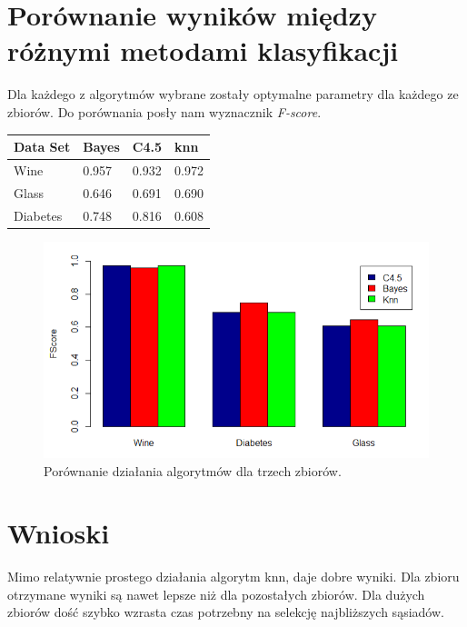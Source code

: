 \documentclass[12pt,a4paper]{article}
\begin{document}
\section{Porównanie wyników między różnymi metodami klasyfikacji}
Dla każdego z algorytmów wybrane zostały optymalne parametry dla każdego ze zbiorów. Do porównania posły nam wyznacznik \textit{F-score}.

\begin{tabular}{ |p{2.5cm}||p{2.5cm}|p{2.5cm}|p{2.5cm}| }
\hline
Data Set & Bayes & C4.5 & knn \\
\hline
Wine & 0.957 & 0.932 & 0.972 \\
Glass & 0.646 & 0.691 & 0.690 \\
Diabetes & 0.748 & 0.816 & 0.608 \\
\hline
\end{tabular}

\begin{figure}[H]
\centering
\includegraphics[width=1\textwidth]{Comparasion.PNG}
\caption{Porównanie działania algorytmów dla trzech zbiorów.}
\end{figure}

\section{Wnioski}
Mimo relatywnie prostego działania algorytm knn, daje dobre wyniki. Dla zbioru otrzymane wyniki są nawet lepsze niż dla pozostałych zbiorów. Dla dużych zbiorów dość szybko wzrasta czas potrzebny na selekcję najbliższych sąsiadów.
\end{document}
